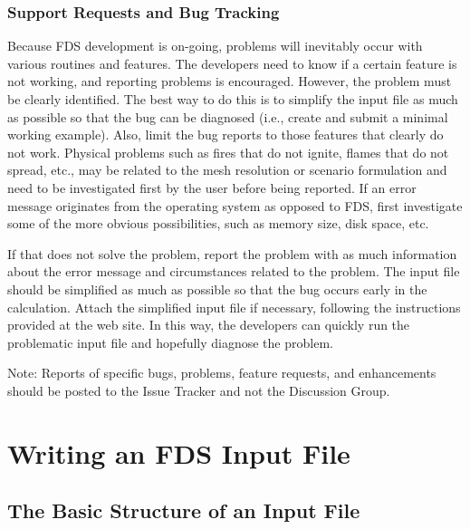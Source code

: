 \documentclass[11pt]{book}
\begin{document}
\section{Support Requests and Bug Tracking}

Because FDS development is on-going, problems will inevitably occur
with various routines and features. The developers need to know if a certain
feature is not working, and reporting problems is encouraged. However, the
problem must be clearly identified. The best way to do this is to simplify
the input file as much as possible so that the bug can be diagnosed
(i.e., create and submit a minimal working example).
Also, limit the bug reports to those features that clearly do not work.
Physical problems such as fires that do not ignite, flames that do not
spread, etc., may be related to the mesh resolution or scenario
formulation and need to be investigated first by the user before being
reported. If an error message originates from the operating system as
opposed to FDS, first investigate some of the more obvious possibilities,
such as memory size, disk space, etc.

If that does not solve the problem, report the problem with as much information about the error message and
circumstances related to the problem. The input file should be simplified
as much as possible so that the bug occurs early in the calculation.
Attach the simplified input file if necessary, following the instructions provided at the web site.
In this way, the developers can quickly run the problematic input file and hopefully diagnose the problem.

\begin{warning}
\noindent
Note: Reports of specific bugs, problems, feature requests, and enhancements
should be posted to the Issue Tracker and not the Discussion Group.
\end{warning}








\part{Writing an FDS Input File}
\label{info:inputfilecreation}



\chapter{The Basic Structure of an Input File}
\label{info:fdsBasic}
\end{document}
